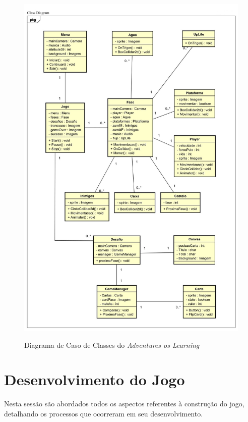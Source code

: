 \documentclass[
	12pt,				%
    oneside,			%
	a4paper,			%
	english,			%
	french,				%
	spanish,			%
	brazil,				%
	]{abntex2}
\begin{document}
			\begin{figure}[H]
				\caption{Diagrama de Caso de Classes do \textit{Adventures os Learning}}
				\centering				
				\includegraphics[width=1\linewidth]{Imagens/04}	
				\label{fig:04}
			\end{figure}
			
		
	\section{Desenvolvimento  do Jogo}
		Nesta sessão são abordados todos os aspectos referentes à construção do jogo, detalhando os processos que ocorreram em seu desenvolvimento.
			
\end{document}
